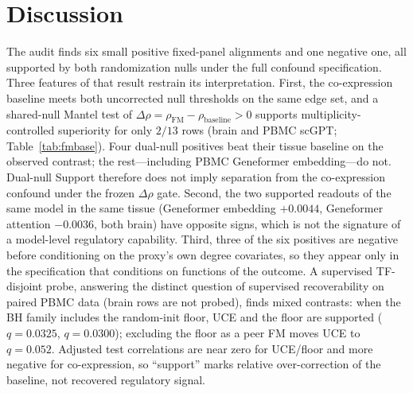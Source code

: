 \documentclass[fleqn,10pt,lineno]{wlpeerj}
\begin{document}
\section{Discussion}
The audit finds six small positive fixed-panel alignments and one negative one, all supported by
both randomization nulls under the full confound specification. Three features of that result
restrain its interpretation. First, the co-expression baseline meets both uncorrected null
thresholds on the same edge set, and a shared-null Mantel test of
$\Delta\rho=\rho_{\mathrm{FM}}-\rho_{\mathrm{baseline}}>0$ supports multiplicity-controlled
superiority for only $2/13$ rows (brain and PBMC scGPT; Table~\ref{tab:fmbase}). Four dual-null
positives beat their tissue baseline on the observed contrast; the rest---including PBMC
Geneformer embedding---do not. Dual-null Support therefore does not imply separation from the
co-expression confound under the frozen $\Delta\rho$ gate. Second, the two supported readouts of
the same model in the same tissue (Geneformer embedding $+0.0044$, Geneformer attention
$-0.0036$, both brain) have opposite signs, which is not the signature of a model-level
regulatory capability. Third, three of the six positives are negative before conditioning on the
proxy's own degree covariates, so they appear only in the specification that conditions on
functions of the outcome. A supervised TF-disjoint probe, answering the distinct question of
supervised recoverability on paired PBMC data (brain rows are not probed), finds mixed contrasts:
when the BH family includes the random-init floor, UCE and the floor are supported ($q=0.0325$,
$q=0.0300$); excluding the floor as a peer FM moves UCE to $q=0.052$. Adjusted test correlations
are near zero for UCE/floor and more negative for co-expression, so ``support'' marks relative
over-correction of the baseline, not recovered regulatory signal.
\end{document}
